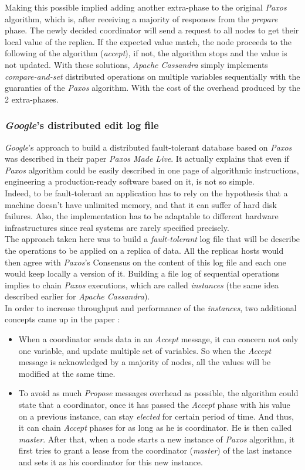 \documentclass[a4paper]{report}
\newcommand{\ca}{\emph{Apache Cassandra\xspace}}
\newcommand{\px}{\emph{Paxos\xspace}}
\begin{document}
Making this possible implied adding another extra-phase to the original \px{} algorithm, which is, after receiving a majority of responses from the \emph{prepare} phase. The newly decided coordinator will send a request to all nodes to get their local value of the replica. If the expected value match, the node proceeds to the following of the algorithm (\emph{accept}), if not, the algorithm stops and the value is not updated.
With these solutions, \ca{} simply implements \emph{compare-and-set} distributed operations on multiple variables sequentially with the guaranties of the \px{} algorithm. With the cost of the overhead produced by the 2 extra-phases.

\subsubsection{\emph{Google}'s distributed edit log file}
\emph{Google}'s approach to build a distributed fault-tolerant database based on \px{} was described in their paper \emph{Paxos Made Live}. It actually explains that even if \px{} algorithm could be easily described in one page of algorithmic instructions, engineering a production-ready software based on it, is not so simple.\\
Indeed, to be fault-tolerant an application has to rely on the hypothesis that a machine doesn't have unlimited memory, and that it can suffer of hard disk failures. Also, the implementation has to be adaptable to different hardware infrastructures since real systems are rarely specified precisely.\\
The approach taken here was to build a \emph{fault-tolerant} log file that will be describe the operations to be applied on a replica of data. All the replicas hosts would then agree with \px{}'s Consensus on the content of this log file and each one would keep locally a version of it. Building a file log of sequential operations implies to chain \px{} executions, which are called \emph{instances} (the same idea described earlier for \ca{}).\\
In order to increase throughput and performance of the \emph{instances}, two additional concepts came up in the paper : 
\begin{itemize}
	\item When a coordinator sends data in an \emph{Accept} message, it can concern not only one variable, and update multiple set of variables. So when the \emph{Accept} message is acknowledged by a majority of nodes, all the values will be modified at the same time.
	\item To avoid as much \emph{Propose} messages overhead as possible, the algorithm could state that a coordinator, once it has passed the \emph{Accept} phase with his value on a previous instance, can stay \emph{elected} for certain period of time. And thus, it can chain \emph{Accept} phases for as long as he is coordinator. He is then called \emph{master}. After that, when a node starts a new instance of \px{} algorithm, it first tries to grant a lease from the coordinator (\emph{master}) of the last instance and sets it as his coordinator for this new instance.
\end{itemize}
\end{document}
